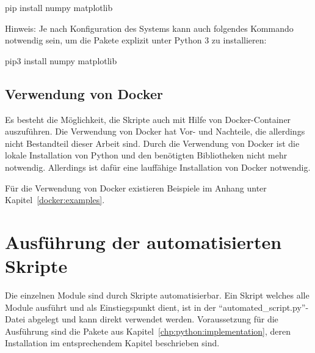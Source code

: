 \begin{PipCommandLinux}
pip install numpy matplotlib
\end{PipCommandLinux}
Hinweis: Je nach Konfiguration des Systems kann auch folgendes Kommando notwendig sein, um die Pakete explizit unter Python 3 zu installieren: 

{}{}

\begin{Pip3CommandLinux}
pip3 install numpy matplotlib
\end{Pip3CommandLinux}

\section{Verwendung von Docker}
Es besteht die Möglichkeit, die Skripte auch mit Hilfe von Docker-Container auszuführen.
Die Verwendung von Docker hat Vor- und Nachteile, die allerdings nicht Bestandteil dieser Arbeit sind.
Durch die Verwendung von Docker ist die lokale Installation von Python und den benötigten Bibliotheken nicht mehr notwendig.
Allerdings ist dafür eine lauffähige Installation von Docker notwendig.

Für die Verwendung von Docker existieren Beispiele im Anhang unter Kapitel~\ref{docker:examples}.







\chapter{Ausführung der automatisierten Skripte}
\label{chp:execution:scripts}
Die einzelnen Module sind durch Skripte automatisierbar.
Ein Skript welches alle Module ausführt und als Einstiegspunkt dient, ist in der \enquote{automated\_script.py}-Datei abgelegt und kann direkt verwendet werden.
Voraussetzung für die Ausführung sind die Pakete aus Kapitel~\ref{chp:python:implementation}, deren Installation im entsprechendem Kapitel beschrieben sind.

